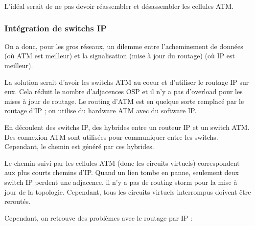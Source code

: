 			L'idéal serait de ne pas devoir réassembler et désassembler les cellules ATM.
	
			\subsubsection{Intégration de switchs IP}
						
			On a donc, pour les gros réseaux, un dilemme entre l'acheminement de données (où ATM est meilleur) et la signalisation (mise à jour du routage) (où IP est meilleur).

			La solution serait d'avoir les switchs ATM au coeur et d'utiliser le routage IP sur eux. Cela réduit le nombre d'adjacences OSP et il n'y a pas d'overload pour les mises à jour de routage. Le routing d'ATM est en quelque sorte remplacé par le routage d'IP ; on utilise du hardware ATM avec du software IP.
						
		
			En découlent des switchs IP, des hybrides entre un routeur IP et un switch ATM. Des connexion ATM sont utilisées pour communiquer entre les switchs. Cependant, le chemin est généré par ces hybrides.
			
			
			Le chemin suivi par les cellules ATM (donc les circuits virtuels) correspondent aux plus courts chemins d'IP.
			Quand un lien tombe en panne, seulement deux switch IP perdent une adjacence, il n'y a pas de routing storm pour la mise à jour de la topologie. Cependant, tous les circuits virtuels interrompus doivent être reroutés.
	
			Cependant, on retrouve des problèmes avec le routage par IP :
	
